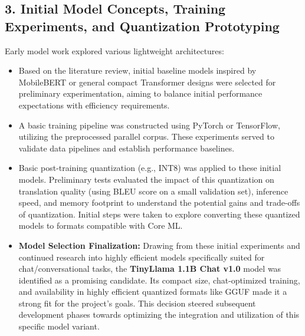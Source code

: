 \documentclass[12pt]{article}
\begin{document}
\subsection*{3. Initial Model Concepts, Training Experiments, and Quantization Prototyping}
Early model work explored various lightweight architectures:
\begin{itemize}
    \item Based on the literature review, initial baseline models inspired by MobileBERT or general compact Transformer designs were selected for preliminary experimentation, aiming to balance initial performance expectations with efficiency requirements.
    \item A basic training pipeline was constructed using PyTorch or TensorFlow, utilizing the preprocessed parallel corpus. These experiments served to validate data pipelines and establish performance baselines.
    \item Basic post-training quantization (e.g., INT8) was applied to these initial models. Preliminary tests evaluated the impact of this quantization on translation quality (using BLEU score on a small validation set), inference speed, and memory footprint to understand the potential gains and trade-offs of quantization. Initial steps were taken to explore converting these quantized models to formats compatible with Core ML.
    \item \textbf{Model Selection Finalization:} Drawing from these initial experiments and continued research into highly efficient models specifically suited for chat/conversational tasks, the \textbf{TinyLlama 1.1B Chat v1.0} model was identified as a promising candidate. Its compact size, chat-optimized training, and availability in highly efficient quantized formats like GGUF made it a strong fit for the project's goals. This decision steered subsequent development phases towards optimizing the integration and utilization of this specific model variant.
\end{itemize}
\end{document}
